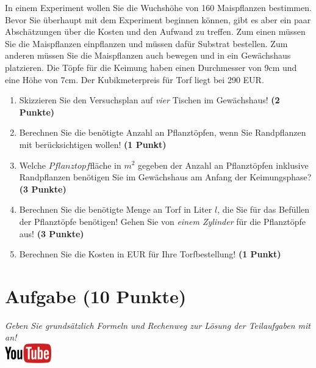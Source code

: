 \documentclass[a4paper, 9pt]{scrartcl}\usepackage[]{graphicx}\usepackage[]{xcolor}
\begin{document}
In einem Experiment wollen Sie die Wuchsh{\"o}he von 160
Maispflanzen bestimmen. Bevor Sie {\"u}berhaupt mit dem Experiment beginnen
k{\"o}nnen, gibt es aber ein paar Absch{\"a}tzungen {\"u}ber die Kosten und den Aufwand
zu treffen. Zum einen m{\"u}ssen Sie die Maispflanzen einpflanzen und m{\"u}ssen
daf{\"u}r Substrat bestellen. Zum anderen m{\"u}ssen Sie die Maispflanzen auch
bewegen und in ein Gew{\"a}chshaus platzieren. Die T{\"o}pfe f{\"u}r die Keimung haben
einen Durchmesser von 9cm und eine H{\"o}he von 7cm. Der
Kubikmeterpreis f{\"u}r Torf liegt bei 290 EUR.

\begin{enumerate}
\item Skizzieren Sie den Versuchsplan auf \textit{vier} Tischen im
  Gew{\"a}chshaus! \textbf{(2 Punkte)}
\item Berechnen Sie die ben{\"o}tigte Anzahl an Pflanzt{\"o}pfen, wenn Sie
  Randpflanzen mit ber{\"u}cksichtigen wollen! \textbf{(1 Punkt)}
\item Welche $Pflanztopf$fl{\"a}che in $m^2$ gegeben der Anzahl an
  Pflanzt{\"o}pfen inklusive Randpflanzen ben{\"o}tigen Sie im Gew{\"a}chshaus am
  Anfang der Keimungsphase?  \textbf{(3 Punkte)}
\item Berechnen Sie die ben{\"o}tigte Menge an Torf in Liter $l$, die Sie f{\"u}r
  das Bef{\"u}llen der Pflanzt{\"o}pfe ben{\"o}tigen! Gehen Sie von \textit{einem
    Zylinder} f{\"u}r die Pflanzt{\"o}pfe aus!  \textbf{(3 Punkte)}
\item Berechnen Sie die Kosten in EUR f{\"u}r Ihre Torfbestellung! \textbf{(1
    Punkt)}
\end{enumerate}



 
\clearpage

\section{Aufgabe \hfill (10 Punkte)}

\textit{Geben Sie grunds{\"a}tzlich Formeln und Rechenweg zur L{\"o}sung der
  Teilaufgaben mit an!} \\[1Ex]

\hfill\href{https://youtu.be/n451XnhtSh4}{\includegraphics[width = 2cm]{img/youtube}} %
\hspace{2Ex}
\end{document}
